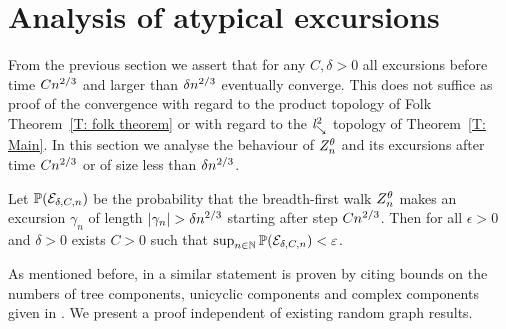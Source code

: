 
\section{Analysis of atypical excursions} \label{S: late excursions}
From the previous section we assert that for any $C, \delta > 0$ all excursions before time $Cn^{2 / 3}$ and larger than $\delta n^{2 / 3}$ 
eventually converge.
This does not suffice as proof of the convergence with regard to the product topology of Folk Theorem~\ref{T: folk theorem} or with regard to the $\mathit{l}^2_{\searrow}$ topology of Theorem~\ref{T: Main}.
In this section we analyse the behaviour of $Z_n^{\theta}$ and its excursions after time $Cn^{2 / 3}$ or of size less than $\delta n^{2 / 3}$. 

\begin{lemma} \label{L: late excursions}
	Let 
	$\mathbb{P}(\mathcal{E}_{\delta, C, n})$ 
	be the probability that the breadth-first walk $Z_n^{\theta}$ makes an excursion $\gamma_n$ of length 
	$|\gamma_n| > \delta n^{2 / 3}$ starting after step $Cn^{2 / 3}$.
	Then for all $\epsilon>0$ and $\delta > 0$ exists $C>0$ such that $\sup_{n \in \mathbb{N}} \mathbb{P}(\mathcal{E}_{\delta, C, n}) < \varepsilon$. 
\end{lemma}
\begin{note}
	As mentioned before, in \cite[Lemma 9, p.826]{Aldous.1997} a similar statement is proven
	by citing bounds on the numbers of tree components, unicyclic components and complex components
	given in \cite{Luczak.1994}.
	We present a proof independent of existing random graph results.
\end{note}

